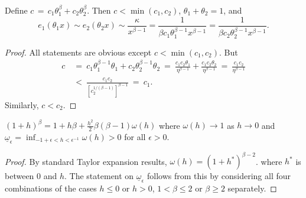 \begin{lemma}\label{Lemma:9.11a} Define
$c\,=\, c_1\theta_1^\beta+c_2\theta_2^\beta$.
Then $c<\min(c_1,c_2)$, $\theta_1+\theta_2=1$, and
\begin{equation}\label{11.11b}
e_1(\theta_1 x) \sim e_2(\theta_2 x) \sim \frac{\kappa}{x^{\beta-1}} = \frac{1}{\beta c_1\theta_1^{\beta-1}x^{\beta-1}} = \frac{1}{\beta c_2\theta_2^{\beta-1}x^{\beta-1}}.
\end{equation}
\end{lemma}
\begin{proof} All statements are obvious except $c<\min(c_1,c_2)$. But
\begin{align}\label{SA4.2b}
c\ &=\ c_1\theta_1^{\beta-1}\theta_1+c_2\theta_2^{\beta-1}\theta_2
\ =\ \frac{c_1c_2\theta_1}{\eta^{\beta-1}}
+\frac{c_1c_2\theta_2}{\eta^{\beta-1}}\ =\ \frac{c_1c_2}{\eta^{\beta-1}}\\ 
\nonumber &<\ \frac{c_1c_2}{{[c_2^{1/(\beta-1)}]}^{\beta-1}}
\ =\ c_1.
\end{align}
Similarly, $c<c_2$.
\end{proof}

\begin{lemma}\label{Lemma:10.11a} $\displaystyle  (1+h)^\beta = 1+h\beta +\frac{h^2}{2}
\beta(\beta-1)\omega(h)$
where $\omega(h)\to 1$ as $h\to 0$ and
$\underline \omega_\epsilon=\inf_{-1+\epsilon<h<\epsilon^{-1}}\omega(h)>0$ for all $\epsilon>0$.
\end{lemma}
\begin{proof}  By standard Taylor expansion results, $\omega(h)=(1+h^*)^{\beta-2}$.
where $h^*$ is between $0$ and $h$. The statement on $\underline \omega_\epsilon$ follows from this by considering
all four combinations of the cases $h\le 0$ or $h>0$, $1<\beta\le 2$ or $\beta\ge 2$ separately.
\end{proof}


